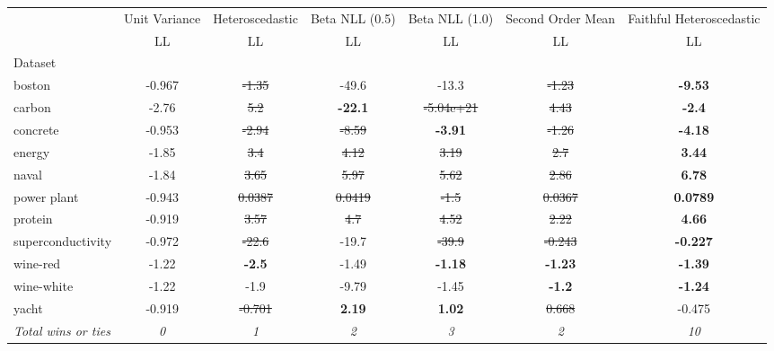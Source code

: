 \begin{tabular}{l|c|c|c|c|c|c}
\toprule
{} & {Unit Variance} & {Heteroscedastic} & {Beta NLL (0.5)} & {Beta NLL (1.0)} & {Second Order Mean} & {Faithful Heteroscedastic} \\
{} & {LL} & {LL} & {LL} & {LL} & {LL} & {LL} \\
{Dataset} & {} & {} & {} & {} & {} & {} \\
\midrule
boston & -0.967 & \sout{-1.35} & -49.6 & -13.3 & \sout{-1.23} & \textbf{-9.53} \\
carbon & -2.76 & \sout{5.2} & \textbf{-22.1} & \sout{-5.04e+21} & \sout{4.43} & \textbf{-2.4} \\
concrete & -0.953 & \sout{-2.94} & \sout{-8.59} & \textbf{-3.91} & \sout{-1.26} & \textbf{-4.18} \\
energy & -1.85 & \sout{3.4} & \sout{4.12} & \sout{3.19} & \sout{2.7} & \textbf{3.44} \\
naval & -1.84 & \sout{3.65} & \sout{5.97} & \sout{5.62} & \sout{2.86} & \textbf{6.78} \\
power plant & -0.943 & \sout{0.0387} & \sout{0.0419} & \sout{-1.5} & \sout{0.0367} & \textbf{0.0789} \\
protein & -0.919 & \sout{3.57} & \sout{4.7} & \sout{4.52} & \sout{2.22} & \textbf{4.66} \\
superconductivity & -0.972 & \sout{-22.6} & -19.7 & \sout{-39.9} & \sout{-0.243} & \textbf{-0.227} \\
wine-red & -1.22 & \textbf{-2.5} & -1.49 & \textbf{-1.18} & \textbf{-1.23} & \textbf{-1.39} \\
wine-white & -1.22 & -1.9 & -9.79 & -1.45 & \textbf{-1.2} & \textbf{-1.24} \\
yacht & -0.919 & \sout{-0.701} & \textbf{2.19} & \textbf{1.02} & \sout{0.668} & -0.475 \\
\textit{{Total wins or ties}} & \textit{0} & \textit{1} & \textit{2} & \textit{3} & \textit{2} & \textit{10} \\
\bottomrule
\end{tabular}
